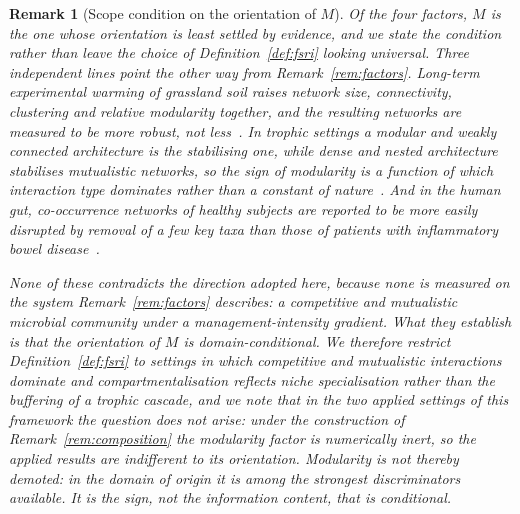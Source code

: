 \documentclass[11pt,a4paper]{article}
\newtheorem{remark}{Remark}
\begin{document}
\begin{remark}[Scope condition on the orientation of $M$]
\label{rem:modularity_scope}
Of the four factors, $M$ is the one whose \emph{orientation} is least settled
by evidence, and we state the condition rather than leave the choice of
Definition~\ref{def:fsri} looking universal. Three independent lines point the
other way from Remark~\ref{rem:factors}. Long-term experimental warming of
grassland soil raises network size, connectivity, clustering \emph{and}
relative modularity together, and the resulting networks are measured to be
more robust, not less~\cite{yuan2021}. In trophic settings a modular and
weakly connected architecture is the stabilising one, while dense and nested
architecture stabilises mutualistic networks, so the sign of modularity is a
function of which interaction type dominates rather than a constant of
nature~\cite{thebault2010}. And in the human gut, co-occurrence networks of
healthy subjects are reported to be \emph{more} easily disrupted by removal of
a few key taxa than those of patients with inflammatory bowel
disease~\cite{baldassano2016}.

None of these contradicts the direction adopted here, because none is measured
on the system Remark~\ref{rem:factors} describes: a competitive and
mutualistic microbial community under a management-intensity gradient. What
they establish is that the orientation of $M$ is domain-conditional. We
therefore restrict Definition~\ref{def:fsri} to settings in which competitive
and mutualistic interactions dominate and compartmentalisation reflects niche
specialisation rather than the buffering of a trophic cascade, and we note
that in the two applied settings of this framework the question does not
arise: under the construction of Remark~\ref{rem:composition} the modularity
factor is numerically inert, so the applied results are indifferent to its
orientation. Modularity is not thereby demoted: in the domain of origin it is
among the strongest discriminators available. It is the sign, not the
information content, that is conditional.
\end{remark}
\end{document}

